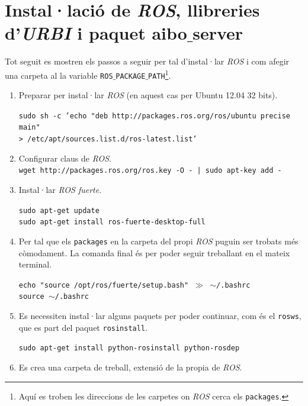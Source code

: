 \documentclass[12pt,a4paper,final,twoside]{report}
\begin{document}

\label{Referencies}


\appendix
\clearpage %
\addappheadtotoc
\appendixpage

\chapter{Instal·lació de \textit{ROS}, llibreries d'\textit{URBI} i paquet aibo$\_$server}

Tot seguit es mostren els passos a seguir per tal d'instal·lar \textit{ROS} i com afegir una carpeta al la variable \texttt{ROS$\_$PACKAGE$\_$PATH}\footnote{Aquí es troben les direccions de les carpetes on \textit{ROS} cerca els \texttt{packages}.}.

\begin{enumerate}

\item Preparar per instal·lar \textit{ROS} (en aquest cas per Ubuntu 12.04 32 bits).

\texttt{sudo sh -c 'echo "deb http://packages.ros.org/ros/ubuntu precise main" \\> /etc/apt/sources.list.d/ros-latest.list'}

\item Configurar claus de \textit{ROS}.\\
\texttt{wget http://packages.ros.org/ros.key -O - | sudo apt-key add -}

\item Instal·lar \textit{ROS fuerte}.

\texttt{sudo apt-get update}\\
\texttt{sudo apt-get install ros-fuerte-desktop-full}

\item Per tal que els \texttt{packages} en la carpeta del propi \textit{ROS} puguin ser trobats més còmodament. La comanda final és per poder seguir treballant en el mateix terminal.

\texttt{echo "source /opt/ros/fuerte/setup.bash" $\gg$ $\sim$/.bashrc\\source $\sim$/.bashrc}

\item Es necessiten instal·lar alguns paquets per poder continuar, com és el \texttt{rosws}, que es part del paquet \texttt{rosinstall}.

\texttt{sudo apt-get install python-rosinstall python-rosdep}

\item Es crea una carpeta de treball, extensió de la propia de \textit{ROS}.


\end{enumerate}
\end{document}
